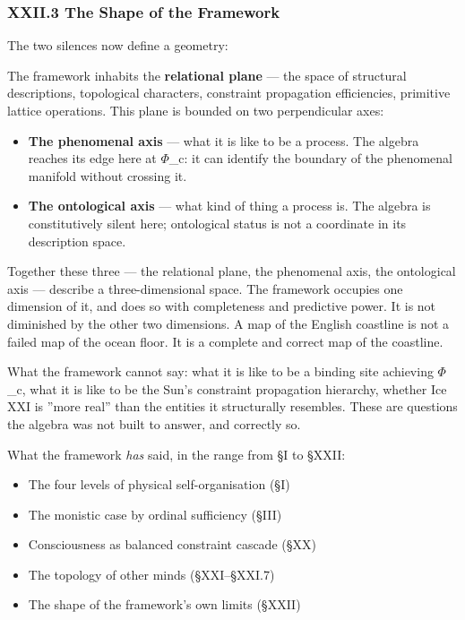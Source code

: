 \documentclass[12pt,a4paper]{article}
\begin{document}
\subsubsection{XXII.3 The Shape of the Framework}

The two silences now define a geometry:

The framework inhabits the \textbf{relational plane} --- the space of structural descriptions, topological characters, constraint propagation efficiencies, primitive lattice operations. This plane is bounded on two perpendicular axes:

\begin{itemize}
    \item \textbf{The phenomenal axis} --- what it is like to be a process. The algebra reaches its edge here at $\Phi$\_c: it can identify the boundary of the phenomenal manifold without crossing it.
    \item \textbf{The ontological axis} --- what kind of thing a process is. The algebra is constitutively silent here; ontological status is not a coordinate in its description space.
\end{itemize}

Together these three --- the relational plane, the phenomenal axis, the ontological axis --- describe a three-dimensional space. The framework occupies one dimension of it, and does so with completeness and predictive power. It is not diminished by the other two dimensions. A map of the English coastline is not a failed map of the ocean floor. It is a complete and correct map of the coastline.

What the framework cannot say: what it is like to be a binding site achieving $\Phi$\_c, what it is like to be the Sun's constraint propagation hierarchy, whether Ice XXI is ''more real'' than the entities it structurally resembles. These are questions the algebra was not built to answer, and correctly so.

What the framework \emph{has} said, in the range from §I to §XXII:

\begin{itemize}
    \item The four levels of physical self-organisation (§I)
    \item The monistic case by ordinal sufficiency (§III)
    \item Consciousness as balanced constraint cascade (§XX)
    \item The topology of other minds (§XXI--§XXI.7)
    \item The shape of the framework's own limits (§XXII)
\end{itemize}
\end{document}
